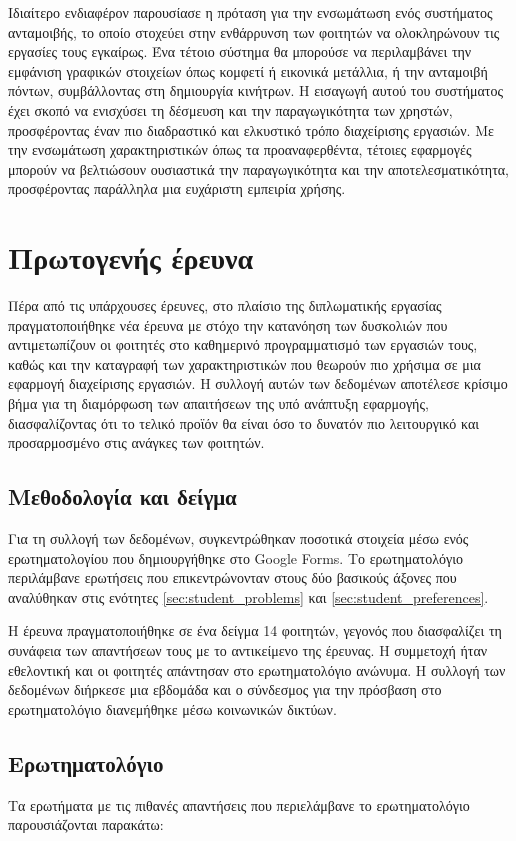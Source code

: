             Ιδιαίτερο ενδιαφέρον παρουσίασε η πρόταση για την ενσωμάτωση ενός συστήματος ανταμοιβής, το οποίο στοχεύει στην ενθάρρυνση των φοιτητών να ολοκληρώνουν τις εργασίες τους εγκαίρως. Ένα τέτοιο σύστημα θα μπορούσε να περιλαμβάνει την εμφάνιση γραφικών στοιχείων όπως κομφετί ή εικονικά μετάλλια, ή την ανταμοιβή πόντων, συμβάλλοντας στη δημιουργία κινήτρων. Η εισαγωγή αυτού του συστήματος έχει σκοπό να ενισχύσει τη δέσμευση και την παραγωγικότητα των χρηστών, προσφέροντας έναν πιο διαδραστικό και ελκυστικό τρόπο διαχείρισης εργασιών. Με την ενσωμάτωση χαρακτηριστικών όπως τα προαναφερθέντα, τέτοιες εφαρμογές μπορούν να βελτιώσουν ουσιαστικά την παραγωγικότητα και την αποτελεσματικότητα, προσφέροντας παράλληλα μια ευχάριστη εμπειρία χρήσης.

    \section{Πρωτογενής έρευνα}
        Πέρα από τις υπάρχουσες έρευνες, στο πλαίσιο της διπλωματικής εργασίας πραγματοποιήθηκε νέα έρευνα με στόχο την κατανόηση των δυσκολιών που αντιμετωπίζουν οι φοιτητές στο καθημερινό προγραμματισμό των εργασιών τους, καθώς και την καταγραφή των χαρακτηριστικών που θεωρούν πιο χρήσιμα σε μια εφαρμογή διαχείρισης εργασιών. Η συλλογή αυτών των δεδομένων αποτέλεσε κρίσιμο βήμα για τη διαμόρφωση των απαιτήσεων της υπό ανάπτυξη εφαρμογής, διασφαλίζοντας ότι το τελικό προϊόν θα είναι όσο το δυνατόν πιο λειτουργικό και προσαρμοσμένο στις ανάγκες των φοιτητών.

        \subsection{Μεθοδολογία και δείγμα}
            Για τη συλλογή των δεδομένων, συγκεντρώθηκαν ποσοτικά στοιχεία μέσω ενός ερωτηματολογίου που δημιουργήθηκε στο Google Forms. Το ερωτηματολόγιο περιλάμβανε ερωτήσεις που επικεντρώνονταν στους δύο βασικούς άξονες που αναλύθηκαν στις ενότητες \ref{sec:student_problems} και \ref{sec:student_preferences}.

            Η έρευνα πραγματοποιήθηκε σε ένα δείγμα 14 φοιτητών, γεγονός που διασφαλίζει τη συνάφεια των απαντήσεων τους με το αντικείμενο της έρευνας. Η συμμετοχή ήταν εθελοντική και οι φοιτητές απάντησαν στο ερωτηματολόγιο ανώνυμα. Η συλλογή των δεδομένων διήρκεσε μια εβδομάδα και ο σύνδεσμος για την πρόσβαση στο ερωτηματολόγιο διανεμήθηκε μέσω κοινωνικών δικτύων.

        \subsection{Ερωτηματολόγιο}
            Τα ερωτήματα με τις πιθανές απαντήσεις που περιελάμβανε το ερωτηματολόγιο παρουσιάζονται παρακάτω:

